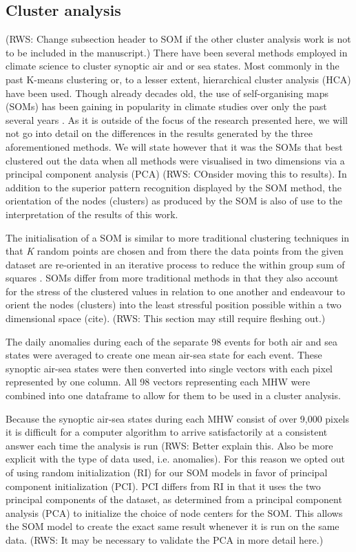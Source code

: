 \documentclass[a4paper,10pt,review]{elsarticle}
\begin{document}
\subsection{Cluster analysis}
(RWS: Change subsection header to SOM if the other cluster analysis work is not to be included in the manuscript.)
There have been several methods employed in climate science to cluster synoptic air and or sea states. Most commonly in the past K-means clustering \citep[e.g.]{Corte-Real1998, Burrough2001, Kumar2011} or, to a lesser extent, hierarchical cluster analysis (HCA) \citep[e.g.][]{Unal2003} have been used. Though already decades old, the use of self-organising maps (SOMs) has been gaining in popularity in climate studies over only the past several years \citep[e.g.][]{Cavazos2000, Hewitson2002, Morioka2010}. As it is outside of the focus of the research presented here, we will not go into detail on the differences in the results generated by the three aforementioned methods. We will state however that it was the SOMs that best clustered out the data when all methods were visualised in two dimensions via a principal component analysis (PCA) (RWS: COnsider moving this to results). In addition to the superior pattern recognition displayed by the SOM method, the orientation of the nodes (clusters) as produced by the SOM is also of use to the interpretation of the results of this work.

The initialisation of a SOM is similar to more traditional clustering techniques in that \emph{K} random points are chosen and from there the data points from the given dataset are re-oriented in an iterative process to reduce the within group sum of squares \citep{Jain2010}. SOMs differ from more traditional methods in that they also account for the stress of the clustered values in relation to one another and endeavour to orient the nodes (clusters) into the least stressful position possible within a two dimensional space (cite). (RWS: This section may still require fleshing out.)

The daily anomalies during each of the separate 98 events for both air and sea states were averaged to create one mean air-sea state for each event. These synoptic air-sea states were then converted into single vectors with each pixel represented by one column. All 98 vectors representing each MHW were combined into one dataframe to allow for them to be used in a cluster analysis.

Because the synoptic air-sea states during each MHW consist of over 9,000 pixels it is difficult for a computer algorithm to arrive satisfactorily at a consistent answer each time the analysis is run (RWS: Better explain this. Also be more explicit with the type of data used, i.e. anomalies). For this reason we opted out of using random initialization (RI) for our SOM models in favor of principal component initialization (PCI). PCI differs from RI in that it uses the two principal components of the dataset, as determined from a principal component analysis (PCA) to initialize the choice of node centers for the SOM. This allows the SOM model to create the exact same result whenever it is run on the same data. (RWS: It may be necessary to validate the PCA in more detail here.)
\end{document}
